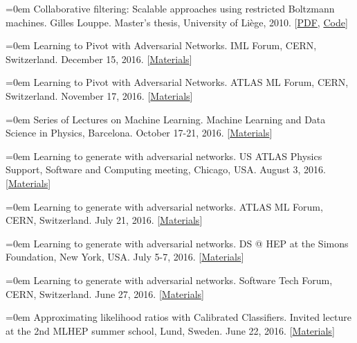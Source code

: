 \documentclass{scrartcl}
\newcommand{\MarginText}[1]{\marginpar{\raggedleft\itshape\small#1}}
\newcommand{\NewPublication}[4]{\noindent\hangindent=0em\hangafter=0 \MarginText{\color{black} #1}{\footnotesize [{\color{Maroon}#2}]} #3 {\footnotesize\color{gray}#4}\vspace{0.5em}}
\begin{document}
\begin{cv}{}
\NewPublication{}{1}{Collaborative filtering: Scalable approaches using restricted Boltzmann machines.}{%
Gilles Louppe.
Master's thesis, University of Li{\`e}ge, 2010.
[\href{http://hdl.handle.net/2268/74400}{PDF}, \href{http://hdl.handle.net/2268/74400}{Code}]}

\vspace{1em}



\vspace{1em}

\NewPublication{2016}{33}{Learning to Pivot with Adversarial Networks.}{%
IML Forum, CERN, Switzerland.
December 15, 2016.
[\href{https://github.com/glouppe/talk-learning-to-pivot}{Materials}]}

\NewPublication{}{32}{Learning to Pivot with Adversarial Networks.}{%
ATLAS ML Forum, CERN, Switzerland.
November 17, 2016.
[\href{https://github.com/glouppe/talk-learning-to-pivot}{Materials}]}

\NewPublication{}{31}{Series of Lectures on Machine Learning.}{%
Machine Learning and Data Science in Physics, Barcelona.
October 17-21, 2016.
[\href{https://github.com/iccub-ml/lectures-glouppe}{Materials}]}

\NewPublication{}{30}{Learning to generate with adversarial networks.}{%
US ATLAS Physics Support, Software and Computing meeting, Chicago, USA.
August 3, 2016.
[\href{https://indico.cern.ch/event/526308/}{Materials}]}

\NewPublication{}{29}{Learning to generate with adversarial networks.}{%
ATLAS ML Forum, CERN, Switzerland.
July 21, 2016.
[\href{https://indico.cern.ch/event/556591/}{Materials}]}

\NewPublication{}{28}{Learning to generate with adversarial networks.}{%
DS @ HEP at the Simons Foundation, New York, USA.
July 5-7, 2016.
[\href{https://indico.hep.caltech.edu/indico/conferenceTimeTable.py?confId=102}{Materials}]}

\NewPublication{}{27}{Learning to generate with adversarial networks.}{%
Software Tech Forum, CERN, Switzerland.
June 27, 2016.
[\href{https://indico.cern.ch/event/544644/contributions/2210328/attachments/1299201/1938586/slides.pdf}{Materials}]}

\NewPublication{}{26}{Approximating likelihood ratios with Calibrated Classifiers.}{%
Invited lecture at the 2nd MLHEP summer school, Lund, Sweden.
June 22, 2016.
[\href{https://github.com/glouppe/talk-approximating-likelihood-ratios-with-classifiers}{Materials}]}


\end{cv}
\end{document}
